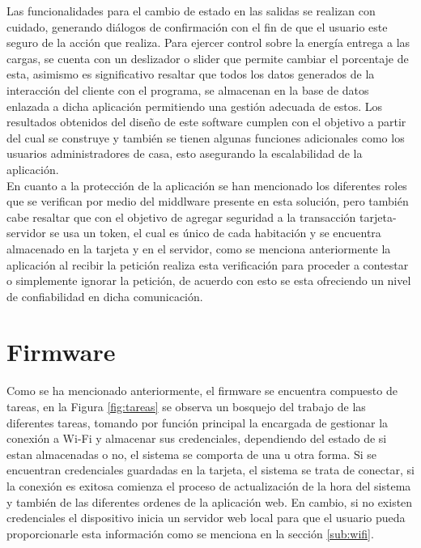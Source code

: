 Las funcionalidades para el cambio de estado en las salidas se realizan con cuidado, generando diálogos de confirmación con el fin de que el usuario este seguro de la acción que realiza. Para ejercer control sobre la energía entrega a las cargas, se cuenta con un deslizador o slider que permite cambiar el porcentaje de esta, asimismo es significativo resaltar que todos los datos generados de la interacción del cliente con el programa, se almacenan en la base de datos enlazada a dicha aplicación permitiendo una gestión adecuada de estos. Los resultados obtenidos del diseño de este software cumplen con el objetivo a partir del cual se construye y también se tienen algunas funciones adicionales como los usuarios administradores de casa, esto asegurando la escalabilidad de la aplicación. \\

En cuanto a la protección de la aplicación se han mencionado los diferentes roles que se verifican por medio del middlware presente en esta solución, pero también cabe resaltar que con el objetivo de agregar seguridad a la transacción tarjeta-servidor se usa un token, el cual es único de cada habitación y se encuentra almacenado en la tarjeta y en el servidor, como se menciona anteriormente la aplicación al recibir la petición realiza esta verificación para proceder a contestar o simplemente ignorar la petición, de acuerdo con esto se esta ofreciendo un nivel de confiabilidad en dicha comunicación.\\

\section{Firmware}

Como se ha mencionado anteriormente, el firmware se encuentra compuesto de tareas, en la Figura \ref{fig:tareas} se observa un bosquejo del trabajo de las diferentes tareas, tomando por función principal la encargada de gestionar la conexión a Wi-Fi y almacenar sus credenciales, dependiendo del estado de si estan almacenadas o no, el sistema se comporta de una u otra forma. Si se encuentran credenciales guardadas en la tarjeta, el sistema se trata de conectar, si la conexión es exitosa comienza el proceso de actualización de la hora del sistema y también de las diferentes ordenes de la aplicación web. En cambio, si no existen credenciales el dispositivo inicia un servidor web local para que el usuario pueda proporcionarle esta información como se menciona en la sección \ref{sub:wifi}.\\

